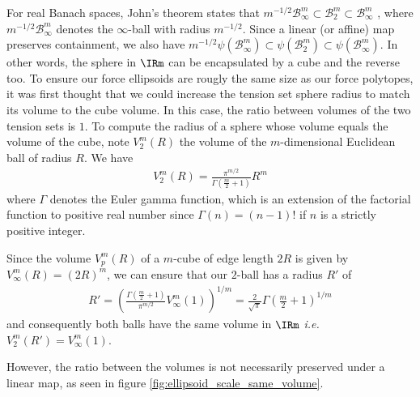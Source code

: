 For real Banach spaces, John's theorem \cite{johnExtremumProblemsWithInequalities1948} states that $m^{-1/2}\mathcal{B}_{\infty}^m \subset \mathcal{B}_2^m \subset \mathcal{B}_{\infty}^m$ , where $m^{-1/2}\mathcal{B}_{\infty}^m$ denotes the $\infty$-ball with radius $m^{-1/2}$. Since a linear (or affine) map preserves containment, we also have $m^{-1/2}\psi(\mathcal{B}_{\infty}^m) \subset \psi(\mathcal{B}_2^m) \subset \psi(\mathcal{B}_{\infty}^m)$. In other words, the sphere in $\IRm$ can be encapsulated by a cube and the reverse too. 
To ensure our force ellipsoids are rougly the same size as our force polytopes, it was first thought that we could increase the tension set sphere radius to match its volume to the cube volume. In this case, the ratio between volumes of the two tension sets is $1$. To compute the radius of a sphere whose volume equals the volume of the cube, note $V_2^m(R)$ the volume of the $m$-dimensional Euclidean ball of radius $R$. We have
\begin{align}
\label{formula_volume_nsphere}
    V_2^m(R) = \frac{\pi^{m/2}}{\Gamma\left(\frac{m}{2} + 1\right)}R^m
\end{align}
where $\Gamma$ denotes the Euler gamma function, which is an extension of the factorial function to positive real number since $\Gamma(n)=(n-1)!$ if $n$ is a strictly positive integer.

Since the volume $V_p^m(R)$ of a $m$-cube of edge length $2R$ is given by $V_{\infty}^m(R) = (2R)^m$, we can ensure that our $2$-ball has a radius $R'$ of 
\begin{align}
\label{formula:cube_sphere_same_radius}
R' = \left(\frac{\Gamma\left(\frac{m}{2} + 1\right)}{\pi^{m/2}}V_{\infty}^m(1)\right)^{1/m} = \frac{2}{\sqrt{\pi}}\Gamma\left(\frac{m}{2} + 1\right)^{1/m}
\end{align}
and consequently both balls have the same volume in $\IRm$ \emph{i.e.} $V_2^m(R') = V_{\infty}^m(1)$.

However, the ratio between the volumes is not necessarily preserved under a linear map, as seen in figure \ref{fig:ellipsoid_scale_same_volume}.

